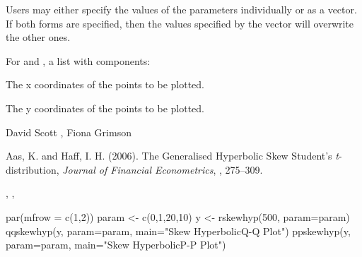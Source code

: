 \begin{Details}\relax
Users may either specify the values of the parameters individually or
as a vector. If both forms are specified, then the values specified by
the vector  will overwrite the other ones.
\end{Details}
\begin{Value}
For  and , a list with components:
\begin{ldescription}
\item[\code{x}] The x coordinates of the points to be plotted.
\item[\code{y}] The y coordinates of the points to be plotted.
\end{ldescription}
\end{Value}
\begin{Author}\relax
David Scott , Fiona Grimson
\end{Author}
\begin{References}\relax
Aas, K. and Haff, I. H. (2006).
The Generalised Hyperbolic Skew Student's \emph{t}-distribution,
\emph{Journal of Financial Econometrics}, , 275--309.
\end{References}
\begin{SeeAlso}\relax
{}, , 
\end{SeeAlso}
\begin{Examples}
\begin{ExampleCode}
par(mfrow = c(1,2))
param <- c(0,1,20,10)
y <- rskewhyp(500, param=param)
qqskewhyp(y, param=param, main="Skew Hyperbolic\n Q-Q Plot")
ppskewhyp(y, param=param, main="Skew Hyperbolic\n P-P Plot")
\end{ExampleCode}
\end{Examples}

